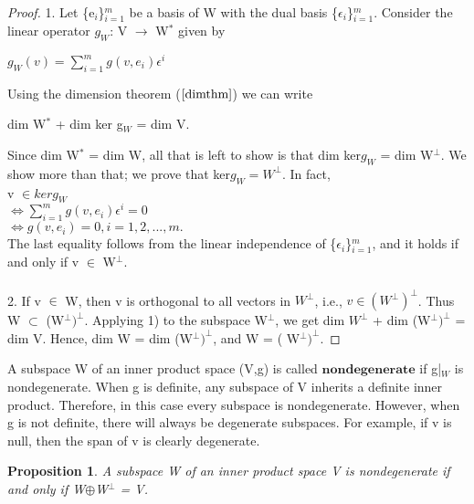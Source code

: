 \documentclass[12pt,a4paper]{article}
\newtheorem{prop}{Proposition}
\begin{document}
\begin{proof}
1. Let \{e$_i$\}$^m_{i=1}$  be a basis of W with the dual basis \{$\epsilon$$_i$\}$^m_{i=1}$. Consider the linear operator $g_W$: V $\to$ W$^*$ given by
\begin{center}
$g_W(v) = \sum_{i=1}^{m} g(v, e_i)\epsilon^i$
\end{center}
 Using the dimension theorem ($\ref{dimthm}$) we can write
 \begin{center}
dim W$^*$ + dim ker g$_W$ = dim V.
\end{center}
Since dim W$^*$ = dim W, all that is left to show is that dim ker$g_W$ = dim W$^\perp$. We show more than that; we prove that ker$g_W = W^\perp$. In fact,\\
v $\in ker g_W$ \\
$\Leftrightarrow \sum^m_{i=1} g(v, e_i) \epsilon^i = 0$\\
$\Leftrightarrow g(v, e_i) = 0, i = 1, 2, ... , m. $\\
The last equality follows from the linear independence of  \{$\epsilon$$_i$\}$^m_{i=1}$, and it holds if and only if v $\in$ W$^\perp$.\\\\
2. If v $\in$ W, then v is orthogonal to all vectors in $W^\perp$, i.e., $v \in (W^\perp)^\perp$. Thus W $\subset$ (W$^\perp)^\perp$. Applying 1) to the subspace
W$^\perp$, we get dim $W^\perp$ + dim (W$^\perp)^\perp$ = dim V. Hence, dim W = dim (W$^\perp)^\perp$, and W = ( W$^\perp)^\perp$.
\end{proof}
A subspace W of an inner product space (V,g) is called $\textbf{nondegenerate}$ if g|$_W$ is nondegenerate. When g is definite, any subspace of V inherits
a definite inner product. Therefore, in this case every subspace is nondegenerate. However, when g is not definite, there will always be degenerate
subspaces. For example, if v is null, then the span of v is clearly degenerate.

\begin{prop}
A subspace W of an inner product space V is nondegenerate if and only if W$\oplus$W$^\perp$ = V.
\end{prop}
\end{document}
